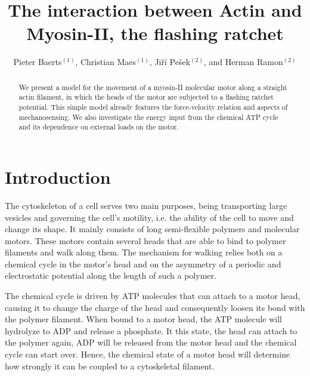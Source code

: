 \documentclass[aps,pre,twocolumn,showpacs,showkeys,a4paper]{revtex4}
\begin{document}
 

\title{The interaction between Actin and Myosin-II, the flashing ratchet}
\author{Pieter Baerts$^{(1)}$, Christian Maes$^{(1)}$, Jiří Pešek$^{(2)}$, and Herman Ramon$^{(2)}$}
\begin{abstract}
We present a model for the movement of a myosin-II molecular motor along a straight actin filament, in which the heads of the motor are subjected to a flashing ratchet potential. This simple model already features the force-velocity relation and aspects of mechanosensing. We also investigate the energy input from the chemical ATP cycle and its dependence on external loads on the motor.  
\end{abstract}

\maketitle 

\section{Introduction}

The cytoskeleton of a cell serves two main purposes, being transporting large vesicles and governing the cell's motility, i.e. the ability of the cell to move and change its shape. 
It mainly consists of long semi-flexible polymers and molecular motors. 
These motors contain several heads that are able to bind to polymer filaments and walk along them. 
The mechanism for walking relies both on a chemical cycle in the motor's head and on the asymmetry of a periodic and electrostatic potential along the length of such a polymer.


The chemical cycle is driven by ATP molecules that can attach to a motor head, causing it to change the charge of the head and consequently loosen its bond with the polymer filament. 
When bound to a motor head, the ATP molecule will hydrolyze to ADP and release a phosphate. 
It this state, the head can attach to the polymer again, ADP will be released from the motor head and the chemical cycle can start over. 
Hence, the chemical state of a motor head will determine how strongly it can be coupled to a cytoskeletal filament. 
\end{document}
